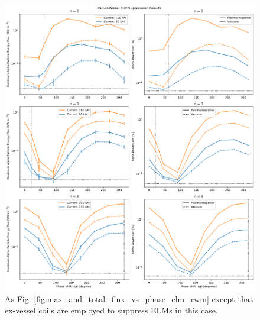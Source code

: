 \documentclass[10pt, a4paper, twoside]{article}
\begin{document}
\begin{figure}[!ht]
    \centering
    \includegraphics[width=0.99\linewidth]{Figures/max_and_total_flux_vs_phase_exterior_rmp.pdf}
    \caption{As Fig. \ref{fig:max_and_total_flux_vs_phase_elm_rwm} except that ex-vessel coils are employed to suppress ELMs in this case.}
    \label{fig:max_and_total_flux_vs_phase_elm}
\end{figure}

\end{document}

